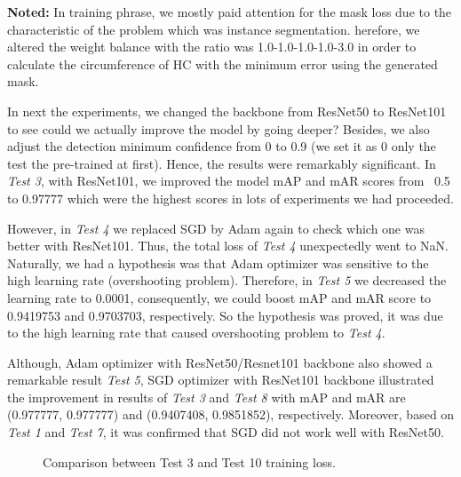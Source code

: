 \noindent	
	\textbf{Noted:} In training phrase, we mostly paid attention for the mask loss due to the characteristic of the problem which was instance segmentation. herefore, we altered the weight balance with the ratio was 1.0-1.0-1.0-1.0-3.0 in order to calculate the circumference of HC with the minimum error using the generated mask.
	
 	In next the experiments, we changed the backbone from ResNet50 to ResNet101 to see could we actually improve the model by going deeper? Besides, we also adjust the detection minimum confidence from 0 to 0.9 (we set it as 0 only the test the pre-trained at first). Hence, the results were remarkably significant. In \textit{Test 3}, with ResNet101, we improved the model mAP and mAR scores from ~0.5 to 0.97777 which were the highest scores in lots of experiments we had proceeded. 
 	
 	However, in \textit{Test 4} we replaced SGD by Adam again to check which one was better with ResNet101. Thus, the total loss of \textit{Test 4} unexpectedly went to NaN. Naturally, we had a hypothesis was that Adam optimizer was sensitive to the high learning rate (overshooting problem). Therefore, in \textit{Test 5} we decreased the learning rate to 0.0001, consequently, we could boost mAP and mAR score to 0.9419753 and 0.9703703, respectively. So the hypothesis was proved, it was due to the high learning rate that caused overshooting problem to \textit{Test 4}.
 	
	Although, Adam optimizer with ResNet50/Resnet101 backbone also showed a remarkable result \textit{Test 5}, SGD optimizer with ResNet101 backbone illustrated the improvement in results of \textit{Test 3} and \textit{Test 8} with mAP and mAR are (0.977777, 0.977777) and (0.9407408, 0.9851852), respectively. Moreover, based on \textit{Test 1} and \textit{Test 7}, it was confirmed that SGD did not work well with ResNet50.
	
	\begin{figure}[H]
		\centering
		\hfill %
		\hfill %
		\caption{Comparison between Test 3 and Test 10 training loss.}
		\label{fig:loss_12}
	\end{figure}
	
